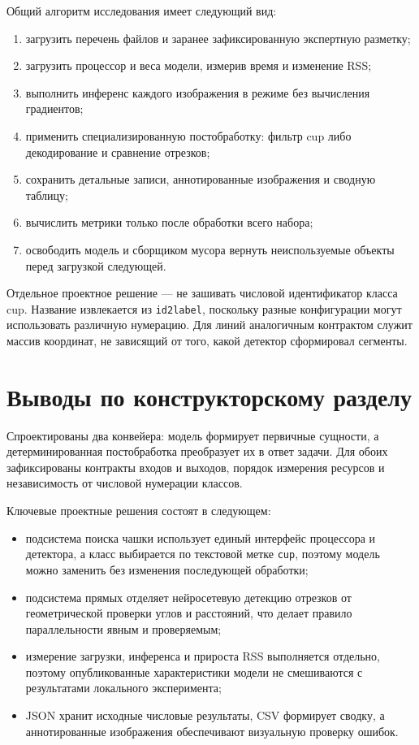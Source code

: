 \documentclass[a4paper,12pt]{extreport}
\newcommand{\code}[1]{\nolinkurl{#1}}
\begin{document}
\begingroup
Общий алгоритм исследования имеет следующий вид:
\begin{enumerate}
\item загрузить перечень файлов и заранее зафиксированную экспертную разметку;
\item загрузить процессор и веса модели, измерив время и изменение RSS;
\item выполнить инференс каждого изображения в режиме без вычисления градиентов;
\item применить специализированную постобработку: фильтр cup либо декодирование и сравнение отрезков;
\item сохранить детальные записи, аннотированные изображения и сводную таблицу;
\item вычислить метрики только после обработки всего набора;
\item освободить модель и сборщиком мусора вернуть неиспользуемые объекты перед загрузкой следующей.
\end{enumerate}

Отдельное проектное решение --- не зашивать числовой идентификатор класса cup. Название извлекается из \code{id2label}, поскольку разные конфигурации могут использовать различную нумерацию. Для линий аналогичным контрактом служит массив координат, не зависящий от того, какой детектор сформировал сегменты.
\endgroup

\section{Выводы по конструкторскому разделу}

Спроектированы два конвейера: модель формирует первичные сущности, а детерминированная постобработка преобразует их в ответ задачи. Для обоих зафиксированы контракты входов и выходов, порядок измерения ресурсов и независимость от числовой нумерации классов.

Ключевые проектные решения состоят в следующем:
\begin{itemize}
\item подсистема поиска чашки использует единый интерфейс процессора и детектора, а класс выбирается по текстовой метке \code{cup}, поэтому модель можно заменить без изменения последующей обработки;
\item подсистема прямых отделяет нейросетевую детекцию отрезков от геометрической проверки углов и расстояний, что делает правило параллельности явным и проверяемым;
\item измерение загрузки, инференса и прироста RSS выполняется отдельно, поэтому опубликованные характеристики модели не смешиваются с результатами локального эксперимента;
\item JSON хранит исходные числовые результаты, CSV формирует сводку, а аннотированные изображения обеспечивают визуальную проверку ошибок.
\end{itemize}
\end{document}
